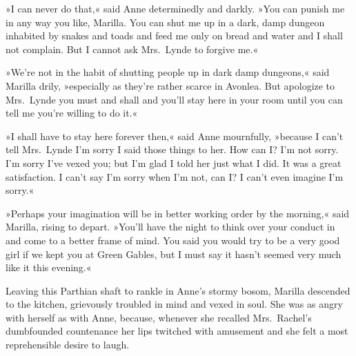 »I can never do that,« said Anne determinedly and darkly. »You can punish me in any way you like, Marilla. You can shut me up in a dark, damp dungeon inhabited by snakes and toads and feed me only on bread and water and I shall not complain. But I cannot ask Mrs.~Lynde to forgive me.«

»We're not in the habit of shutting people up in dark damp dungeons,« said Marilla drily, »especially as they're rather scarce in Avonlea. But apologize to Mrs.~Lynde you must and shall and you'll stay here in your room until you can tell me you're willing to do it.«

»I shall have to stay here forever then,« said Anne mournfully, »because I can't tell Mrs.~Lynde I'm sorry I said those things to her. How can I? I'm not sorry. I'm sorry I've vexed you; but I'm glad I told her just what I did. It was a great satisfaction. I can't say I'm sorry when I'm not, can I? I can't even imagine I'm sorry.«

»Perhaps your imagination will be in better working order by the morning,« said Marilla, rising to depart. »You'll have the night to think over your conduct in and come to a better frame of mind. You said you would try to be a very good girl if we kept you at Green Gables, but I must say it hasn't seemed very much like it this evening.«

Leaving this Parthian shaft to rankle in Anne's stormy bosom, Marilla descended to the kitchen, grievously troubled in mind and vexed in soul. She was as angry with herself as with Anne, because, whenever she recalled Mrs.~Rachel's dumbfounded countenance her lips twitched with amusement and she felt a most reprehensible desire to laugh.